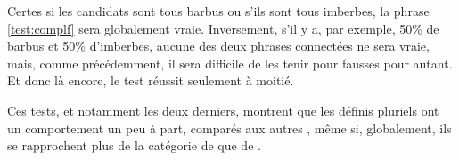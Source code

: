 \begin{exo}
\begin{solu}
Certes si les candidats sont tous barbus ou s'ils sont tous imberbes, la phrase \ref{test:complf} sera globalement vraie.  Inversement, s'il y a, par exemple, 50\% de barbus et 50\% d'imberbes, aucune des deux phrases connectées ne sera vraie, mais, comme précédemment, il sera difficile de les tenir pour fausses pour autant.  Et donc là encore, le test réussit seulement à moitié.

Ces tests, et notamment les deux derniers, montrent que les définis pluriels ont un comportement un peu à part, comparés aux autres \GN, même si, globalement, ils se rapprochent plus de la catégorie de  que de .
\end{solu}
\end{exo}
